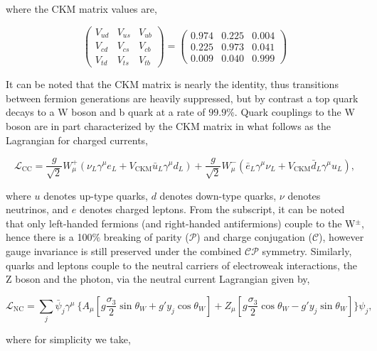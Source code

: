 where the CKM matrix values are, 

\begin{equation}
  \begin{pmatrix}
    V_{ud} & V_{us} & V_{ub} \\
    V_{cd} & V_{cs} & V_{cb} \\
    V_{td} & V_{ts} & V_{tb}
  \end{pmatrix}
 = 
\begin{pmatrix}
  0.974 & 0.225 & 0.004 \\
  0.225 & 0.973 & 0.041 \\ 
  0.009 & 0.040 & 0.999
\end{pmatrix}
\end{equation}

It can be noted that the CKM matrix is nearly the identity, thus transitions between fermion generations are heavily suppressed, but by contrast a top quark decays to a W boson and b quark at a rate of $99.9\%$. Quark couplings to the W boson are in part characterized by the CKM matrix in what follows as the Lagrangian for charged currents,

\begin{equation}
  \mathcal{L}_{\mathrm{CC}} = \frac{g}{\sqrt{2}}W_\mu^+(\nu_L \gamma^\mu e_L + V_{\mathrm{CKM}}\bar{u}_L\gamma^\mu d_L) + \frac{g}{\sqrt{2}}W_\mu^-(\bar{e}_L\gamma^\mu\nu_L + V_{\mathrm{CKM}}\bar{d}_L\gamma^\mu u_L),
\end{equation}

where $u$ denotes up-type quarks, $d$ denotes down-type quarks, $\nu$ denotes neutrinos, and $e$ denotes charged leptons. From the subscript, it can be noted that only left-handed fermions (and right-handed antifermions) couple to the W$^\pm$, hence there is a 100$\%$ breaking of parity ($\mathcal{P}$) and charge conjugation ($\mathcal{C}$), however gauge invariance is still preserved under the combined $\mathcal{CP}$ symmetry. Similarly, quarks and leptons couple to the neutral carriers of electroweak interactions, the Z boson and the photon, via the neutral current Lagrangian given by,

\begin{equation}
  \mathcal{L}_{\mathrm{NC}} = \sum_{j}\bar{\psi}_j \gamma^\mu\ \Big\{ A_\mu [g \frac{\sigma_3}{2}\sin\theta_W + g'y_j \cos\theta_W] + Z_\mu[g\frac{\sigma_3}{2}\cos\theta_W - g'y_j\sin\theta_W] \Big\}\psi_j,
\end{equation}

where for simplicity we take,

